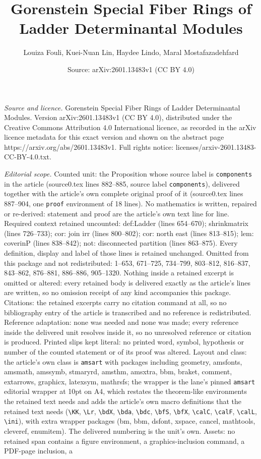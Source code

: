 \documentclass[10pt,a4paper]{amsart}
\title[Gorenstein Special Fiber Rings of Ladder Determinantal Modul]{Gorenstein Special Fiber Rings of Ladder Determinantal Modules}
\author{Louiza Fouli, Kuei-Nuan Lin, Haydee Lindo, Maral Mostafazadehfard}
\date{Source: arXiv:2601.13483v1 (CC BY 4.0)}
\begin{document}
\maketitle

\noindent\emph{Source and licence.} Gorenstein Special Fiber Rings of Ladder Determinantal Modules. Version arXiv:2601.13483v1 (CC BY 4.0), distributed under the Creative Commons Attribution 4.0 International licence, as recorded in the arXiv licence metadata for this exact version and shown on the abstract page https://arxiv.org/abs/2601.13483v1. Full rights notice: licenses/arxiv-2601.13483-CC-BY-4.0.txt.\par\smallskip

\noindent\textit{Editorial scope.} Counted unit: the Proposition whose source label is \texttt{components} in the article (source0.tex lines 882--885, source label \texttt{components}), delivered together with the article's own complete original proof of it (source0.tex lines 887--904, one \texttt{proof} environment of 18 lines). No mathematics is written, repaired or re-derived: statement and proof are the article's own text line for line. Required context retained uncounted: def:Ladder (lines 654--670); shrinkmatrix (lines 726--733); cor: join irr (lines 800--802); cor: north east (lines 813--815); lem: coverinP (lines 838--842); not: disconnected partition (lines 863--875). Every definition, display and label of those lines is retained unchanged. Omitted from this package and not redistributed: 1--653, 671--725, 734--799, 803--812, 816--837, 843--862, 876--881, 886--886, 905--1320. Nothing inside a retained excerpt is omitted or altered: every retained body is delivered exactly as the article's lines are written, so no omission receipt of any kind accompanies this package. Citations: the retained excerpts carry no citation command at all, so no bibliography entry of the article is transcribed and no reference is redistributed. Reference adaptation: none was needed and none was made; every reference inside the delivered unit resolves inside it, so no unresolved reference or citation is produced. Printed slips kept literal: no printed word, symbol, hypothesis or number of the counted statement or of its proof was altered. Layout and class: the article's own class is \texttt{amsart} with packages including geometry, amsfonts, amsmath, amssymb, stmaryrd, amsthm, amsxtra, bbm, braket, comment, extarrows, graphicx, latexsym, mathrsfs; the wrapper is the lane's pinned \texttt{amsart} editorial wrapper at 10pt on A4, which restates the theorem-like environments the retained text needs and adds the article's own macro definitions that the retained text needs (\texttt{\textbackslash KK}, \texttt{\textbackslash Lr}, \texttt{\textbackslash bdX}, \texttt{\textbackslash bda}, \texttt{\textbackslash bdc}, \texttt{\textbackslash bfS}, \texttt{\textbackslash bfX}, \texttt{\textbackslash calC}, \texttt{\textbackslash calF}, \texttt{\textbackslash calL}, \texttt{\textbackslash ini}), with extra wrapper packages (bm, bbm, dsfont, xspace, cancel, mathtools, cleveref, enumitem). The delivered numbering is the unit's own. Assets: no retained span contains a figure environment, a graphics-inclusion command, a PDF-page inclusion, a 
\end{document}
